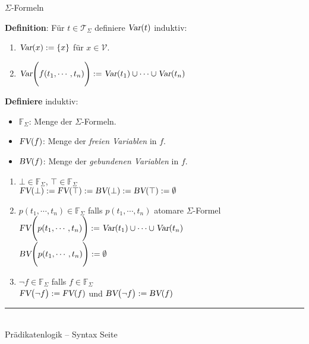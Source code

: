 \documentclass{slides}
\newcommand{\myrule}{\rule{20cm}{1mm}\\ }
\newcommand{\verum}{\top}
\newcommand{\falsum}{\bot}
\newcommand{\var}{\textsl{Var}}
\newcommand{\FV}{\textsl{FV}}
\newcommand{\BV}{\textsl{BV}}
\newcounter{mypage}
\begin{document}
\begin{slide}{}
\normalsize
\begin{center}
$\Sigma$-Formeln
\end{center}
\vspace{0.5cm}

\footnotesize
\textbf{Definition}: 
Für  $t \in \mathcal{T}_\Sigma$ definiere $\var(t)$ induktiv:
\begin{enumerate}
\item $\var(x) := \{ x \}$ \quad für $x \in \mathcal{V}$.
\item $\var\Bigg( f(t_1,\cdots,t_n) \Bigg) := \var(t_1) \cup \cdots \cup \var(t_n)$ 
\end{enumerate}

\textbf{Definiere} induktiv:
\begin{itemize}
\item $\mathbb{F}_\Sigma$: Menge der $\Sigma$-Formeln.
\item $\FV(f)$: Menge der \emph{freien Variablen} in $f$.
\item $\BV(f)$:            Menge der \emph{gebundenen Variablen} in $f$.
\end{itemize}
\begin{enumerate}
\item  $\falsum \in \mathbb{F}_\Sigma$, $\verum \in \mathbb{F}_\Sigma$  \\[0.1cm]
       $\FV(\falsum) := \FV(\verum) := \BV(\falsum) := \BV(\verum) := \emptyset$
\item $p(t_1,\cdots,t_n) \in \mathbb{F}_\Sigma$ falls $p(t_1,\cdots,t_n)$   atomare $\Sigma$-Formel  \\[0.3cm]
      $\FV\Bigg(p(t_1,\cdots,t_n) \Bigg) := \var(t_1) \cup \cdots \cup \var(t_n)$ \\
      $\BV\Bigg(p(t_1,\cdots,t_n) \Bigg) := \emptyset$
\item $\neg f \in \mathbb{F}_\Sigma$ falls $f \in \mathbb{F}_\Sigma$ \\[0.3cm]
      $\FV\bigl( \neg f \bigr) := \FV(f)$ \quad und \quad $\BV\bigl( \neg f \bigr) := \BV(f)$
\end{enumerate}


\vspace*{\fill}
\tiny \addtocounter{mypage}{1}
\myrule
Prädikatenlogik -- Syntax  \hspace*{\fill} Seite 
\end{slide}

\end{document}
